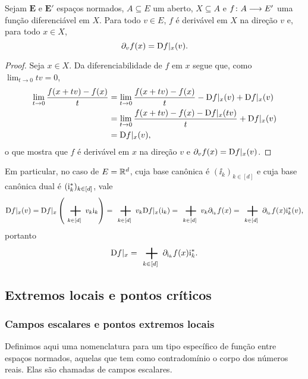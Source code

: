 \begin{proposition}
Sejam $\bm E$ e $\bm E'$ espaços normados, $A \subseteq E$ um aberto, $X \subseteq A$ e ${f}\colon {A} \longrightarrow {E'}$ uma função diferenciável em $X$. Para todo $v \in E$, $f$ é derivável em $X$ na direção $v$ e, para todo $x \in X$,
	\begin{equation*}
	\partial_{v} f(x) = \mathrm{D} f|_x(v).
	\end{equation*}
\end{proposition}
\begin{proof}
Seja $x \in X$. Da diferenciabilidade de $f$ em $x$ segue que, como $\lim_{t \to 0} tv = 0$,
	\begin{align*}
	\lim_{t \to 0} \frac{f(x+tv) - f(x)}{t} &= \lim_{t \to 0} \frac{f(x+tv) - f(x)}{t} - \mathrm{D} f|_x(v) + \mathrm{D} f|_x(v) \\
		&= \lim_{t \to 0} \frac{f(x+tv) - f(x) - \mathrm{D} f|_x(tv)}{t} + \mathrm{D} f|_x(v) \\
		&= \mathrm{D} f|_x(v),
	\end{align*}
o que mostra que $f$ é derivável em $x$ na direção $v$ e $\partial_{v} f(x) = \mathrm{D} f|_x(v)$.
\end{proof}

Em particular, no caso de $E = \mathbb{R}^d$, cuja base canônica é $(\ii_k)_{k \in [d]}$ e cuja base canônica dual é $(\mathrm{i}_k^{\ast})_{k \in [d]}$, vale
	\begin{equation*}
	\D f|_x(v) = \D f|_x \left( \sum_{k \in [d]} v_k \ii_k \right) = \sum_{k \in [d]} v_k \D f|_x(\ii_k) = \sum_{k \in [d]} v_k \dir{\ii_k} f(x) = \sum_{k \in [d]} \dir{\ii_k} f(x)\ii_k\dual(v),
	\end{equation*}
portanto
	\begin{equation*}
	\D f|_x = \sum_{k \in [d]} \dir{\ii_k} f(x) \ii_k\dual.
	\end{equation*}


\subsection{Extremos locais e pontos críticos}

\subsubsection{Campos escalares e pontos extremos locais}

Definimos aqui uma nomenclatura para um tipo específico de função entre espaços normados, aquelas que tem como contradomínio o corpo dos números reais. Elas são chamadas de campos escalares.

